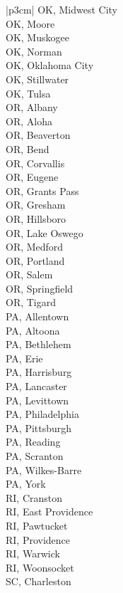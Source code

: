 \begin{customLongTable}{ |p{3cm}| }
OK, Midwest City \\ \hline
OK, Moore \\ \hline
OK, Muskogee \\ \hline
OK, Norman \\ \hline
OK, Oklahoma City \\ \hline
OK, Stillwater \\ \hline
OK, Tulsa \\ \hline
OR, Albany \\ \hline
OR, Aloha \\ \hline
OR, Beaverton \\ \hline
OR, Bend \\ \hline
OR, Corvallis \\ \hline
OR, Eugene \\ \hline
OR, Grants Pass \\ \hline
OR, Gresham \\ \hline
OR, Hillsboro \\ \hline
OR, Lake Oswego \\ \hline
OR, Medford \\ \hline
OR, Portland \\ \hline
OR, Salem \\ \hline
OR, Springfield \\ \hline
OR, Tigard \\ \hline
PA, Allentown \\ \hline
PA, Altoona \\ \hline
PA, Bethlehem \\ \hline
PA, Erie \\ \hline
PA, Harrisburg \\ \hline
PA, Lancaster \\ \hline
PA, Levittown \\ \hline
PA, Philadelphia \\ \hline
PA, Pittsburgh \\ \hline
PA, Reading \\ \hline
PA, Scranton \\ \hline
PA, Wilkes-Barre \\ \hline
PA, York \\ \hline
RI, Cranston \\ \hline
RI, East Providence \\ \hline
RI, Pawtucket \\ \hline
RI, Providence \\ \hline
RI, Warwick \\ \hline
RI, Woonsocket \\ \hline
SC, Charleston \\ \hline

\end{customLongTable}
